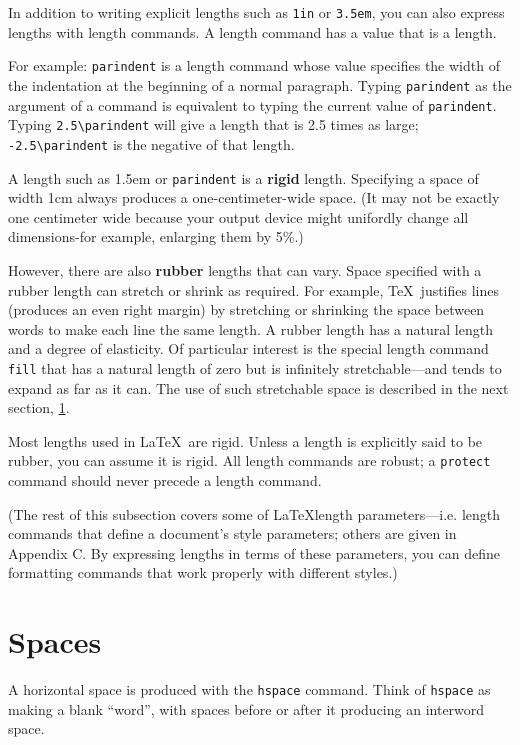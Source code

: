 \documentclass{article}
\begin{document}
In addition to writing explicit lengths such as {\tt 1in} or {\tt 3.5em}, you can also express
lengths with length commands. A length command has a value that is a length. 

For example: \verb:parindent: is a length command whose value specifies the width of the
indentation at the beginning of a normal paragraph. Typing \verb:parindent: as the argument of
a command is equivalent to typing the current value of \verb:parindent:. Typing \verb:2.5\parindent: will give a length that is 2.5 times as large; \verb:-2.5\parindent: is the negative
of that length.

A length such as 1.5em or \verb:parindent: is a \textbf{rigid} length. Specifying a space of
width 1cm always produces a one-centimeter-wide space. (It may not be exactly one centimeter wide
because your output device might unifordly change all dimensions-for example, enlarging them by
5\%.) 

However, there are also \textbf{rubber} lengths that can vary. Space specified with a rubber length
can stretch or shrink as required. For example, \TeX\ justifies lines (produces an even right
margin) by stretching or shrinking the space between words to make each line the same length. A
rubber length has a natural length and a degree of elasticity. Of particular interest is the
special length command \verb:fill: that has a natural length of zero but is infinitely
stretchable---and tends to expand as far as it can. The use of such stretchable space is described
in the next section, \ref{spaces}.

Most lengths used in \LaTeX\ are rigid. Unless a length is explicitly said to be rubber, you can assume it is rigid. All length commands are robust; a \verb:protect: command should never precede a length command.

(The rest of this subsection covers some of \LaTeX length parameters---i.e. length commands that define a document's style parameters; others are given in Appendix C. By expressing lengths in terms of these parameters, you can define formatting commands that work properly with different styles.)


\section{Spaces}\label{spaces}

A horizontal space is produced with the \verb:hspace: command. Think of \verb:hspace: as
making a blank ``word'', with spaces before or after it producing an interword space.
\end{document}
